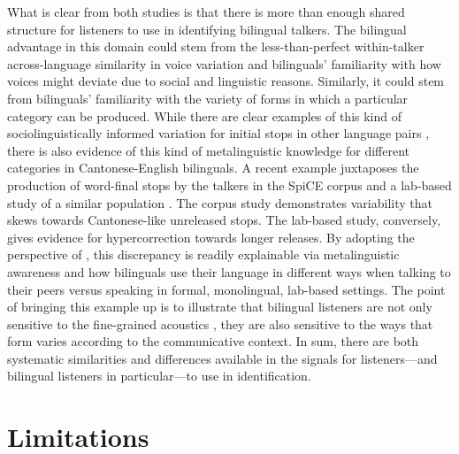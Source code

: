 What is clear from both studies is that there is more than enough shared structure for listeners to use in identifying bilingual talkers. The bilingual advantage in this domain could stem from the less-than-perfect within-talker across-language similarity in voice variation and bilinguals' familiarity with how voices might deviate due to social and linguistic reasons. Similarly, it could stem from bilinguals' familiarity with the variety of forms in which a particular category can be produced. While there are clear examples of this kind of sociolinguistically informed variation for initial stops in other language pairs \citep{bullock_2009_sociophonetics}, there is also evidence of this kind of metalinguistic knowledge for different categories in Cantonese-English bilinguals. A recent example juxtaposes the production of word-final stops by the talkers in the SpiCE corpus \citep{johnson_2021_language} and a lab-based study of a similar population \citep{polinsky_2018_heritage}. The corpus study demonstrates variability that skews towards Cantonese-like unreleased stops. The lab-based study, conversely, gives evidence for hypercorrection towards longer releases. By adopting the perspective of \citet{bullock_2009_sociophonetics}, this discrepancy is readily explainable via metalinguistic awareness and how bilinguals use their language in different ways when talking to their peers versus speaking in formal, monolingual, lab-based settings. The point of bringing this example up is to illustrate that bilingual listeners are not only sensitive to the fine-grained acoustics \citep{ju_2004_falling}, they are also sensitive to the ways that form varies according to the communicative context. In sum, there are both systematic similarities and differences available in the signals for listeners---and bilingual listeners in particular---to use in identification.

\section{Limitations}\label{ch5:sec:limitations}


